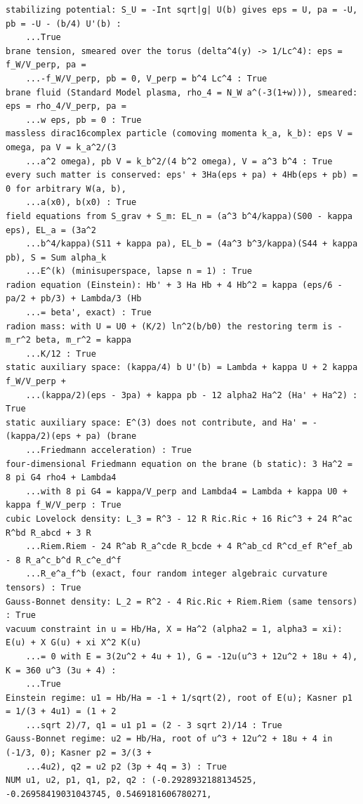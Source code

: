 \documentclass[10pt,a4paper]{article}
\begin{document}
\begin{Verbatim}[fontsize=\small,frame=single,framesep=2mm]
stabilizing potential: S_U = -Int sqrt|g| U(b) gives eps = U, pa = -U, pb = -U - (b/4) U'(b) :
    ...True
brane tension, smeared over the torus (delta^4(y) -> 1/Lc^4): eps = f_W/V_perp, pa =
    ...-f_W/V_perp, pb = 0, V_perp = b^4 Lc^4 : True
brane fluid (Standard Model plasma, rho_4 = N_W a^(-3(1+w))), smeared: eps = rho_4/V_perp, pa =
    ...w eps, pb = 0 : True
massless dirac16complex particle (comoving momenta k_a, k_b): eps V = omega, pa V = k_a^2/(3
    ...a^2 omega), pb V = k_b^2/(4 b^2 omega), V = a^3 b^4 : True
every such matter is conserved: eps' + 3Ha(eps + pa) + 4Hb(eps + pb) = 0 for arbitrary W(a, b),
    ...a(x0), b(x0) : True
field equations from S_grav + S_m: EL_n = (a^3 b^4/kappa)(S00 - kappa eps), EL_a = (3a^2
    ...b^4/kappa)(S11 + kappa pa), EL_b = (4a^3 b^3/kappa)(S44 + kappa pb), S = Sum alpha_k
    ...E^(k) (minisuperspace, lapse n = 1) : True
radion equation (Einstein): Hb' + 3 Ha Hb + 4 Hb^2 = kappa (eps/6 - pa/2 + pb/3) + Lambda/3 (Hb
    ...= beta', exact) : True
radion mass: with U = U0 + (K/2) ln^2(b/b0) the restoring term is -m_r^2 beta, m_r^2 = kappa
    ...K/12 : True
static auxiliary space: (kappa/4) b U'(b) = Lambda + kappa U + 2 kappa f_W/V_perp +
    ...(kappa/2)(eps - 3pa) + kappa pb - 12 alpha2 Ha^2 (Ha' + Ha^2) : True
static auxiliary space: E^(3) does not contribute, and Ha' = -(kappa/2)(eps + pa) (brane
    ...Friedmann acceleration) : True
four-dimensional Friedmann equation on the brane (b static): 3 Ha^2 = 8 pi G4 rho4 + Lambda4
    ...with 8 pi G4 = kappa/V_perp and Lambda4 = Lambda + kappa U0 + kappa f_W/V_perp : True
cubic Lovelock density: L_3 = R^3 - 12 R Ric.Ric + 16 Ric^3 + 24 R^ac R^bd R_abcd + 3 R
    ...Riem.Riem - 24 R^ab R_a^cde R_bcde + 4 R^ab_cd R^cd_ef R^ef_ab - 8 R_a^c_b^d R_c^e_d^f
    ...R_e^a_f^b (exact, four random integer algebraic curvature tensors) : True
Gauss-Bonnet density: L_2 = R^2 - 4 Ric.Ric + Riem.Riem (same tensors) : True
vacuum constraint in u = Hb/Ha, X = Ha^2 (alpha2 = 1, alpha3 = xi): E(u) + X G(u) + xi X^2 K(u)
    ...= 0 with E = 3(2u^2 + 4u + 1), G = -12u(u^3 + 12u^2 + 18u + 4), K = 360 u^3 (3u + 4) :
    ...True
Einstein regime: u1 = Hb/Ha = -1 + 1/sqrt(2), root of E(u); Kasner p1 = 1/(3 + 4u1) = (1 + 2
    ...sqrt 2)/7, q1 = u1 p1 = (2 - 3 sqrt 2)/14 : True
Gauss-Bonnet regime: u2 = Hb/Ha, root of u^3 + 12u^2 + 18u + 4 in (-1/3, 0); Kasner p2 = 3/(3 +
    ...4u2), q2 = u2 p2 (3p + 4q = 3) : True
NUM u1, u2, p1, q1, p2, q2 : (-0.2928932188134525, -0.26958419031043745, 0.5469181606780271,

\end{Verbatim}
\end{document}
